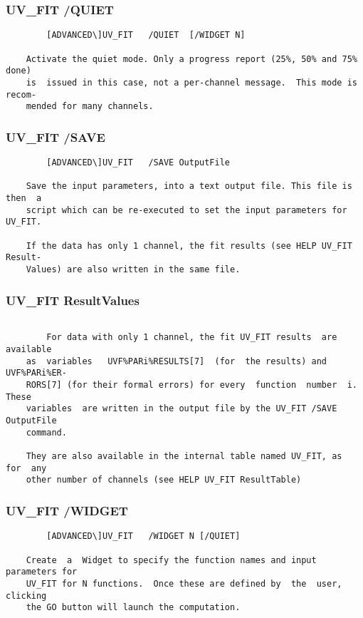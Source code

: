 \subsubsection{UV\_FIT /QUIET}
\begin{verbatim}
        [ADVANCED\]UV_FIT   /QUIET  [/WIDGET N]

    Activate the quiet mode. Only a progress report (25%, 50% and 75%  done)
    is  issued in this case, not a per-channel message.  This mode is recom-
    mended for many channels.

\end{verbatim}
\subsubsection{UV\_FIT /SAVE}
\begin{verbatim}
        [ADVANCED\]UV_FIT   /SAVE OutputFile

    Save the input parameters, into a text output file. This file is then  a
    script which can be re-executed to set the input parameters for UV_FIT.

    If the data has only 1 channel, the fit results (see HELP UV_FIT Result-
    Values) are also written in the same file.

\end{verbatim}
\subsubsection{UV\_FIT ResultValues}
\begin{verbatim}

        For data with only 1 channel, the fit UV_FIT results  are  available
    as  variables   UVF%PARi%RESULTS[7]  (for  the results) and UVF%PARi%ER-
    RORS[7] (for their formal errors) for every  function  number  i.  These
    variables  are written in the output file by the UV_FIT /SAVE OutputFile
    command.

    They are also available in the internal table named UV_FIT, as  for  any
    other number of channels (see HELP UV_FIT ResultTable)

\end{verbatim}
\subsubsection{UV\_FIT /WIDGET}
\begin{verbatim}
        [ADVANCED\]UV_FIT   /WIDGET N [/QUIET]

    Create  a  Widget to specify the function names and input parameters for
    UV_FIT for N functions.  Once these are defined by  the  user,  clicking
    the GO button will launch the computation.

\end{verbatim}
